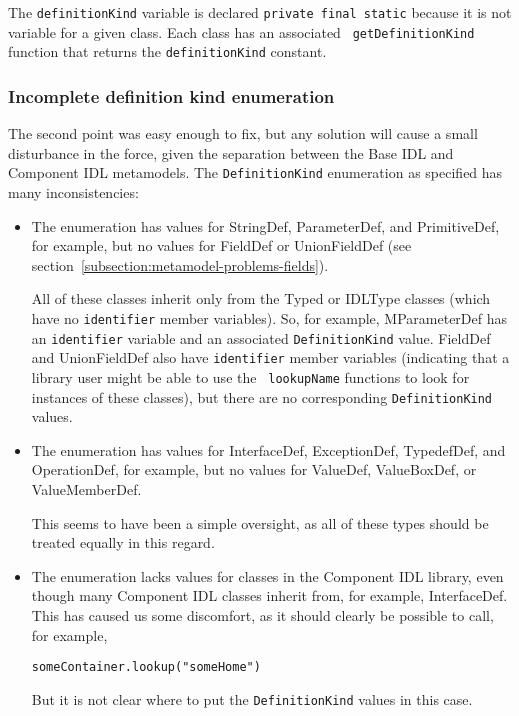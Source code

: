 The {\tt definitionKind} variable is declared {\tt private final static} because
it is not variable for a given class. Each class has an associated {\tt
getDefinitionKind} function that returns the {\tt definitionKind} constant.

\subsubsection{Incomplete definition kind enumeration}

The second point was easy enough to fix, but any solution will cause a small
disturbance in the force, given the separation between the Base IDL and
Component IDL metamodels. The {\tt DefinitionKind} enumeration as specified has
many inconsistencies:

\begin{itemize}
\item The enumeration has values for StringDef, ParameterDef, and PrimitiveDef,
      for example, but no values for FieldDef or UnionFieldDef (see
      section~\ref{subsection:metamodel-problems-fields}).

      All of these classes inherit only from the Typed or IDLType classes (which
      have no {\tt identifier} member variables). So, for example, MParameterDef
      has an {\tt identifier} variable and an associated {\tt DefinitionKind}
      value. FieldDef and UnionFieldDef also have {\tt identifier} member
      variables (indicating that a library user might be able to use the {\tt
      lookupName} functions to look for instances of these classes), but there
      are no corresponding {\tt DefinitionKind} values.
\item The enumeration has values for InterfaceDef, ExceptionDef, TypedefDef, and
      OperationDef, for example, but no values for ValueDef, ValueBoxDef, or
      ValueMemberDef.

      This seems to have been a simple oversight, as all of these types should
      be treated equally in this regard.
\item The enumeration lacks values for classes in the Component IDL library,
      even though many Component IDL classes inherit from, for example,
      InterfaceDef. This has caused us some discomfort, as it should clearly be
      possible to call, for example,
\begin{verbatim}
someContainer.lookup("someHome")
\end{verbatim}
      But it is not clear where to put the {\tt DefinitionKind} values in this
      case.
\end{itemize}

